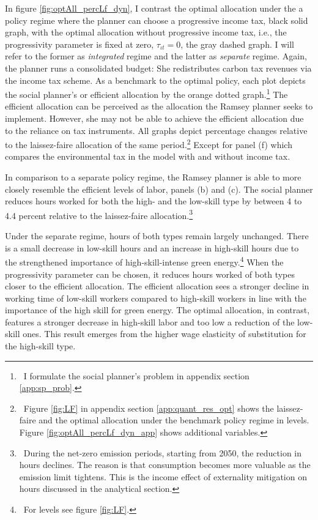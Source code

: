 In figure \ref{fig:optAll_percLf_dyn}, I contrast the optimal allocation under the a policy regime where the planner can choose a progressive income tax, black solid graph, with the optimal allocation without progressive income tax, i.e., the progressivity parameter is fixed at zero, $\tau_{\iota t}=0$, the gray dashed graph. I will refer to the former as \textit{integrated} regime and the latter as \textit{separate} regime. Again, the planner runs a consolidated budget: She redistributes carbon tax revenues via the income tax scheme.  As a benchmark to the optimal policy, each plot depicts the social planner's or efficient allocation by the orange dotted graph.\footnote{\ I formulate the social planner's problem in appendix section \ref{app:sp_prob}.} 
The efficient allocation can be perceived as the allocation the Ramsey planner seeks to implement. However, she may not be able to achieve the efficient allocation due to the reliance on tax instruments.
All graphs depict percentage changes relative to the laissez-faire allocation of the same period.\footnote{\ Figure \ref{fig:LF} in appendix section \ref{app:quant_res_opt} shows the laissez-faire and the optimal allocation under the benchmark policy regime in levels. Figure \ref{fig:optAll_percLf_dyn_app} shows additional variables.}
 Except for panel (f) which compares the environmental tax in the model with and without income tax. 


%
In comparison to a separate policy regime, the Ramsey planner is able to more closely resemble the efficient levels of labor, panels (b) and (c). 
The social planner reduces hours worked for both the high- and the low-skill type by between 4 to 4.4 percent relative to the laissez-faire allocation.\footnote{\ During the net-zero emission periods, starting from 2050, the reduction in hours declines. The reason is that consumption becomes more valuable as the emission limit tightens. This is the income effect of  externality mitigation on hours discussed in the analytical section.} %

Under the separate regime, hours of both types remain largely unchanged. There is a small decrease in low-skill hours and an increase in high-skill hours due to the strengthened importance of high-skill-intense green energy.\footnote{\ For levels see figure \ref{fig:LF}.} When the progressivity parameter can be chosen, it reduces hours worked of both types closer to the efficient allocation. The efficient allocation sees a stronger decline in working time of low-skill workers compared to high-skill workers in line with the importance of the high skill for green energy. The optimal allocation, in contrast, features a stronger decrease in high-skill labor and too low a reduction of the low-skill ones. This result emerges from the higher wage elasticity of substitution for the high-skill type.

